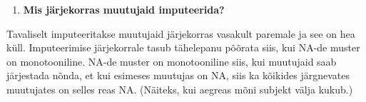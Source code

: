 \documentclass[]{book}
\newenvironment{Shaded}{\begin{snugshade}}{\end{snugshade}}
\newcommand{\DataTypeTok}[1]{\textcolor[rgb]{0.13,0.29,0.53}{#1}}
\newcommand{\DecValTok}[1]{\textcolor[rgb]{0.00,0.00,0.81}{#1}}
\newcommand{\KeywordTok}[1]{\textcolor[rgb]{0.13,0.29,0.53}{\textbf{#1}}}
\newcommand{\NormalTok}[1]{#1}
\newcommand{\OperatorTok}[1]{\textcolor[rgb]{0.81,0.36,0.00}{\textbf{#1}}}
\newcommand{\OtherTok}[1]{\textcolor[rgb]{0.56,0.35,0.01}{#1}}
\newcommand{\StringTok}[1]{\textcolor[rgb]{0.31,0.60,0.02}{#1}}
\providecommand{\tightlist}{%
  \setlength{\itemsep}{0pt}\setlength{\parskip}{0pt}}
\begin{document}
\begin{Shaded}
\end{Shaded}

\begin{enumerate}
\def\labelenumi{\arabic{enumi}.}
\setcounter{enumi}{4}
\tightlist
\item
  \textbf{Mis järjekorras muutujaid imputeerida?}
\end{enumerate}

Tavaliselt imputeeritakse muutujaid järjekorras vasakult paremale ja see on hea küll.
Imputeerimise järjekorrale tasub tähelepanu põõrata siis, kui NA-de muster on monotooniline. NA-de muster on monotooniline siis, kui muutujaid saab järjestada nõnda, et kui esimeses muutujas on NA, siis ka kõikides järgnevates muutujates on selles reas NA. (Näiteks, kui aegreas mõni subjekt välja kukub.)
\end{document}
